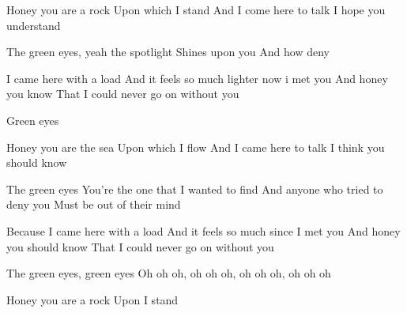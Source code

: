 \resetVars%
%
%
\MakeHeader%
\Lyrics%

Honey you are a rock
Upon which I stand
And I come here to talk
I hope you understand

The green eyes, yeah the spotlight
Shines upon you
And how   deny 

I came here with a load
And it feels so much lighter now i met you
And honey you  know
That I could never go on without you

Green eyes

Honey you are the sea
Upon which I flow
And I came here to talk
I think you should know

The green eyes
You're the one that I wanted to find
And anyone who tried to deny you
Must be out of their mind

\Continuechords
{}Because I came here with a load
And it feels so much  since I met you
And honey you should know
That I could never go on without you

The green eyes, green eyes
Oh oh oh, oh oh oh, oh oh oh, oh oh oh

Honey you are a rock
Upon  I stand
\Next
